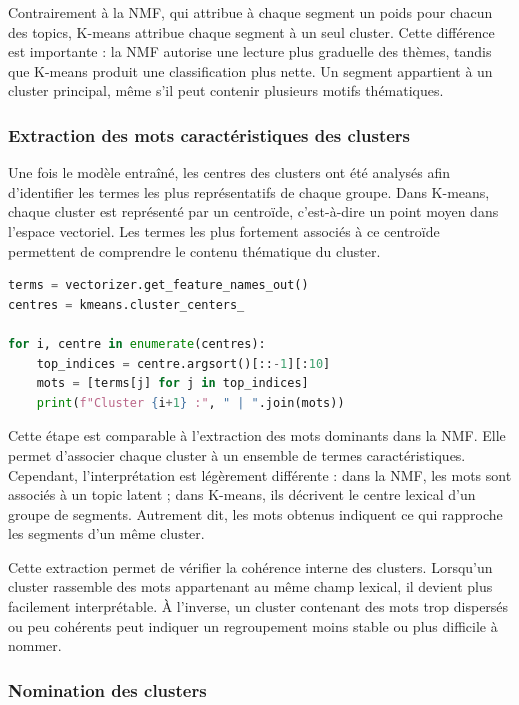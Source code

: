 \documentclass{article}
\begin{document}
Contrairement à la NMF, qui attribue à chaque segment un poids pour chacun des topics, K-means attribue chaque segment à un seul cluster. Cette différence est importante : la NMF autorise une lecture plus graduelle des thèmes, tandis que K-means produit une classification plus nette. Un segment appartient à un cluster principal, même s'il peut contenir plusieurs motifs thématiques.

\subsubsection{Extraction des mots caractéristiques des clusters}

Une fois le modèle entraîné, les centres des clusters ont été analysés afin d'identifier les termes les plus représentatifs de chaque groupe. Dans K-means, chaque cluster est représenté par un centroïde, c'est-à-dire un point moyen dans l'espace vectoriel. Les termes les plus fortement associés à ce centroïde permettent de comprendre le contenu thématique du cluster.

\begin{lstlisting}[language=Python, caption={Extraction des mots les plus représentatifs par cluster}]
terms = vectorizer.get_feature_names_out()
centres = kmeans.cluster_centers_

for i, centre in enumerate(centres):
    top_indices = centre.argsort()[::-1][:10]
    mots = [terms[j] for j in top_indices]
    print(f"Cluster {i+1} :", " | ".join(mots))
\end{lstlisting}

Cette étape est comparable à l'extraction des mots dominants dans la NMF. Elle permet d'associer chaque cluster à un ensemble de termes caractéristiques. Cependant, l'interprétation est légèrement différente : dans la NMF, les mots sont associés à un topic latent ; dans K-means, ils décrivent le centre lexical d'un groupe de segments. Autrement dit, les mots obtenus indiquent ce qui rapproche les segments d'un même cluster.

Cette extraction permet de vérifier la cohérence interne des clusters. Lorsqu'un cluster rassemble des mots appartenant au même champ lexical, il devient plus facilement interprétable. À l'inverse, un cluster contenant des mots trop dispersés ou peu cohérents peut indiquer un regroupement moins stable ou plus difficile à nommer.

\subsubsection{Nomination des clusters}
\end{document}
